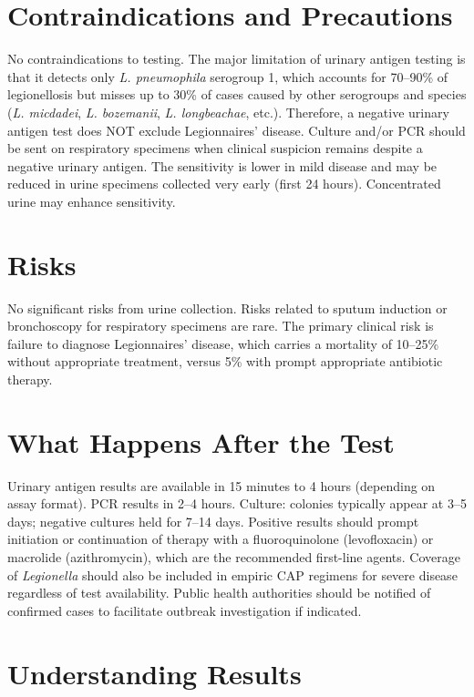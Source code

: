 \section*{Contraindications and Precautions}
No contraindications to testing. The major limitation of urinary antigen testing is that it detects only \textit{L. pneumophila} serogroup 1, which accounts for 70--90\% of legionellosis but misses up to 30\% of cases caused by other serogroups and species (\textit{L. micdadei}, \textit{L. bozemanii}, \textit{L. longbeachae}, etc.). Therefore, a negative urinary antigen test does NOT exclude Legionnaires' disease. Culture and/or PCR should be sent on respiratory specimens when clinical suspicion remains despite a negative urinary antigen. The sensitivity is lower in mild disease and may be reduced in urine specimens collected very early (first 24 hours). Concentrated urine may enhance sensitivity.

\section*{Risks}
No significant risks from urine collection. Risks related to sputum induction or bronchoscopy for respiratory specimens are rare. The primary clinical risk is failure to diagnose Legionnaires' disease, which carries a mortality of 10--25\% without appropriate treatment, versus 5\% with prompt appropriate antibiotic therapy.

\section*{What Happens After the Test}
Urinary antigen results are available in 15 minutes to 4 hours (depending on assay format). PCR results in 2--4 hours. Culture: colonies typically appear at 3--5 days; negative cultures held for 7--14 days. Positive results should prompt initiation or continuation of therapy with a fluoroquinolone (levofloxacin) or macrolide (azithromycin), which are the recommended first-line agents. Coverage of \textit{Legionella} should also be included in empiric CAP regimens for severe disease regardless of test availability. Public health authorities should be notified of confirmed cases to facilitate outbreak investigation if indicated.

\section*{Understanding Results}

